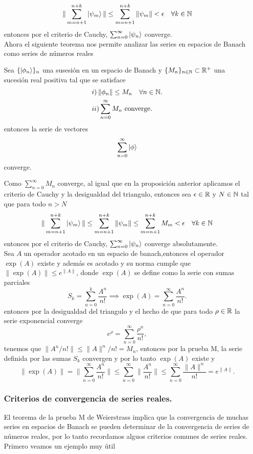 \documentclass[main.tex]{subfiles}
\begin{document}
\[
 \|\sum_{m=n+1}^{n+k}\ket{\psi_m}\|\leq \sum_{m=n+1}^{n+k}\|\psi_m\|<\epsilon\quad\forall k\in \mathbb N 
\]
entonces por el criterio de Cauchy, \(\sum_{n=0}^{\infty}\ket{\psi_n}\) converge.
\QED\\
Ahora el siguiente teorema nos permite analizar las series en espacios de Banach como series de números reales
\begin{teorema}
  Sea \(\{\ket{\phi_n}\}_n\) una susesión en un espacio de Banach y \(\{M_n\}_{n\in \mathbb N }\subset\mathbb R ^{+}\) una sucesión real positiva tal que se satisface
  \begin{align*}
    &i)\,\|\phi_n\|\leq M_n \quad\forall n\in \mathbb N .\\
    &ii)\sum_{n=0}^{\infty}M_n\text{ converge}.
    \end{align*}
  entonces la serie de vectores
  \[
    \sum_{n=0}^{\infty}\ket{\phi}
  \]
  converge.
\end{teorema}
\dem Como \(\sum_{n=0}^{\infty}M_n\) converge, al igual que en la proposición anterior aplicamos el criterio de Cauchy y la desigualdad del triangulo, entonces sea \(\epsilon\in\mathbb R \) y \(N\in \mathbb N \) tal que para todo \(n>N\)
\[
 \|\sum_{m=n+1}^{n+k}\ket{\psi_m}\|\leq \sum_{m=n+1}^{n+k}\|\psi_m\|\leq \sum_{m=n+1}^{n+k}M_m<\epsilon\quad\forall k\in \mathbb N 
\]
entonces por el criterio de Cauchy, \(\sum_{n=0}^{\infty}\ket{\psi_n}\) converge absolutamente.
\QED\\
\eje Sea \(A\) un operador acotado en un espacio de banach,entonces el operador \(\exp(A)\) existe y además es acotado y su norma cumple que \(\|\exp(A)\|\leq e^{\|A\|}\), donde \(\exp(A)\) se define como la serie con sumas parciales
\[
S_k=\sum_{n=0}^{k}\frac{A^n}{n!}\implies\exp(A)=\sum_{n=0}^{\infty}\frac{A^n}{n!}.
\]
entonces por la desigualdad del triangulo y el hecho de que para todo \(\rho\in\mathbb R \) la serie exponencial converge
\[
e^{\rho}=\sum_{n=0}^{\infty}\frac{\rho^n}{n!},
\]
tenemos que \(\|A^n/n!\|\leq\|A\|^n/n!=M_n\), entonces por la prueba M, la serie definida por las sumas \(S_k\) convergen y por lo tanto \(\exp(A)\) existe y
\[
\|\exp(A)\|=\Big\|\sum_{n=0}^{\infty}\frac{A^n}{n!}\Big\|\leq\sum_{n=0}^{\infty}\Big\|\frac{A^n}{n!}\Big\|\leq\sum_{n=0}^{\infty}\frac{\|A\|^n}{n!}=e^{\|A\|}.
\]

\subsubsection{Criterios de convergencia de series reales.}
\noindent El teorema de la prueba M de Weierstrass implica que la convergencia de muchas series en espacios de Banach se pueden determinar de la convergencia de series de números reales, por lo tanto recordamos alguos criterios comunes de series reales. Primero veamos un ejemplo muy útil
\end{document}
